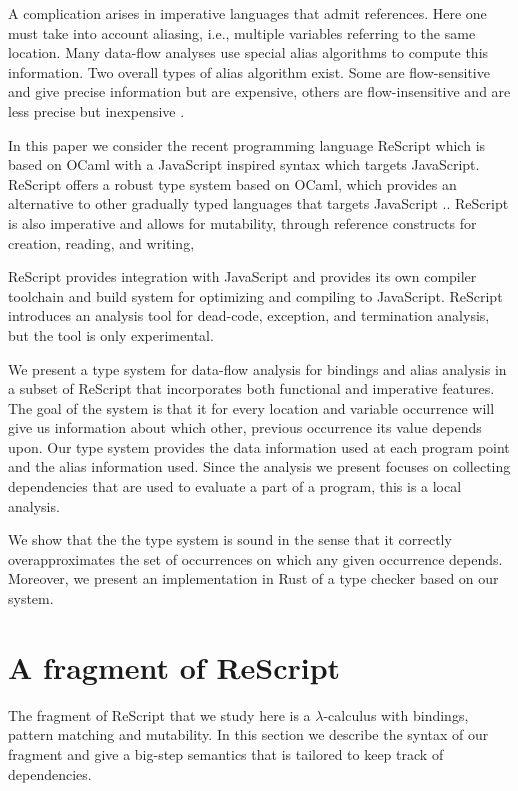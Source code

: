 \documentclass[acmsmall,sigplan]{acmart}
\begin{document}
A complication arises in imperative languages that admit
references. Here one must take into account aliasing, i.e., multiple
variables referring to the same location.  Many data-flow analyses use
special alias algorithms to compute this information.  Two overall
types of alias algorithm exist. Some are flow-sensitive and give
precise information but are expensive, others are flow-insensitive and
are less precise but inexpensive \cite{LiangDonglin1999Eaag,
  EmamiMaryam1994Cipa}.

In this paper we consider the recent programming language ReScript
which is based on OCaml with a JavaScript inspired syntax which
targets JavaScript.  ReScript offers a robust type system based on
OCaml, which provides an alternative to other gradually typed
languages that targets JavaScript .\cite{rescript_rebrand}. ReScript
is also imperative and allows for mutability, through reference
constructs for creation, reading, and writing,

ReScript provides integration with JavaScript and provides its own
compiler toolchain and build system for optimizing and compiling to
JavaScript.  ReScript introduces an analysis tool for
dead-code, exception, and termination analysis, but the tool is only
experimental.\cite{reanalyze} 

We present a type system for data-flow analysis for bindings and alias
analysis in a subset of ReScript that incorporates both functional and
imperative features. The goal of the system is that it for every
location and variable occurrence will give us information about which
other, previous occurrence its value depends upon. Our type system
provides the data information used at each program point and the alias
information used.  Since the analysis we present focuses on collecting
dependencies that are used to evaluate a part of a program, this is a
local analysis.

We show that the the type system is sound in the sense that it
correctly overapproximates the set of occurrences on which any given
occurrence depends. Moreover, we present an implementation in Rust of
a type checker based on our system.

\section{A fragment of ReScript}\label{sec:lang}

The fragment of ReScript that we study here is a $\lambda$-calculus
with bindings, pattern matching and mutability. In this section we
describe the syntax of our fragment and give a big-step semantics that
is tailored to keep track of dependencies.
 
\end{document}
